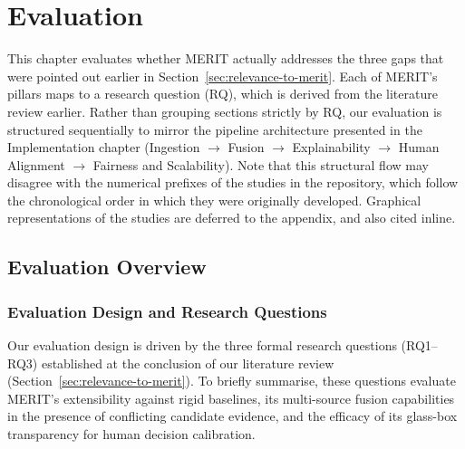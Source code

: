 \chapter{Evaluation}
\label{ch:evaluation}

This chapter evaluates whether MERIT actually addresses the three gaps that were pointed out
earlier in Section~\ref{sec:relevance-to-merit}. 
Each of MERIT's pillars maps to a research question (RQ), which is derived from the literature
review earlier. Rather than grouping sections strictly by RQ, our evaluation is structured sequentially to mirror the pipeline architecture presented in the Implementation chapter (Ingestion $\rightarrow$ Fusion $\rightarrow$ Explainability $\rightarrow$ Human Alignment $\rightarrow$ Fairness and Scalability). Note that
this structural flow may disagree with the numerical prefixes of the studies in the repository, which follow the chronological order in which they were originally developed. Graphical representations of the studies are deferred to the appendix, and also cited inline.

\section{Evaluation Overview}
\label{sec:eval-overview}

\subsection{Evaluation Design and Research Questions}
\label{subsec:eval-design-rqs}

Our evaluation design is driven by the three formal research questions (RQ1--RQ3) established at the conclusion of our literature review (Section~\ref{sec:relevance-to-merit}). To briefly summarise, these questions evaluate MERIT's extensibility against rigid baselines, its multi-source fusion capabilities in the presence of conflicting candidate evidence, and the efficacy of its glass-box transparency for human decision calibration.

